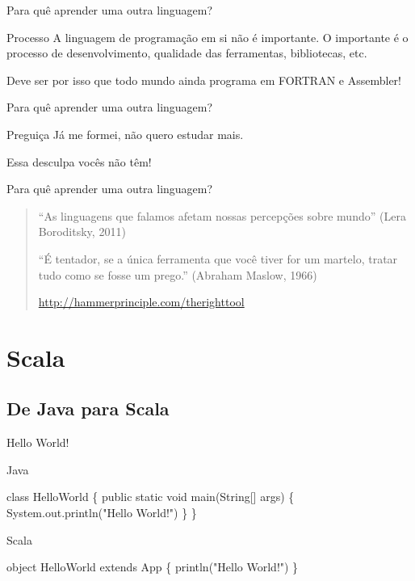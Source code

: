 \documentclass[12pt]{beamer}
\newenvironment{scala}{
\begin{block}{Scala} \begin{semiverbatim}
}{
\end{semiverbatim} \end{block}
}
\newenvironment{java}{
\protect\begin{block}{Java}
\protect\begin{semiverbatim}
}{
\protect\end{semiverbatim}
\protect\end{block}
}
\begin{document}
\begin{frame}{Para quê aprender uma outra linguagem?}
\begin{block}{Processo}
        A linguagem de programação em si não é importante. 
        O importante é o processo de desenvolvimento, 
              qualidade das ferramentas, bibliotecas, etc.
\end{block}
\pause
\begin{alertblock}{}
Deve ser por isso que todo mundo ainda programa em FORTRAN e Assembler!
\end{alertblock}
\end{frame}

\begin{frame}{Para quê aprender uma outra linguagem?}
\begin{block}{Preguiça}
        Já me formei, não quero estudar mais.
\end{block}
\pause
\begin{alertblock}{}
        Essa desculpa vocês não têm!
\end{alertblock}
\end{frame}

\begin{frame}{Para quê aprender uma outra linguagem?}
\begin{quote}
``As linguagens que falamos afetam nossas percepções sobre mundo'' (Lera Boroditsky, 2011)

\bigskip

``É tentador, se a única ferramenta que você tiver for um martelo, tratar tudo como se fosse um prego.'' (Abraham Maslow, 1966)

\bigskip

\url{http://hammerprinciple.com/therighttool}

\end{quote}
\end{frame}

\section{Scala}

\subsection{De Java para Scala}

\begin{frame}[fragile]{Hello World!}

 \begin{java}
class HelloWorld \{
  public static void main(String[] args) \{
    System.out.println("Hello World!")
  \}
\}
 \end{java}
 
 \pause
 
 \begin{scala}
object HelloWorld extends App \{
    println("Hello World!")
\}
 \end{scala}

\end{frame}
\end{document}
